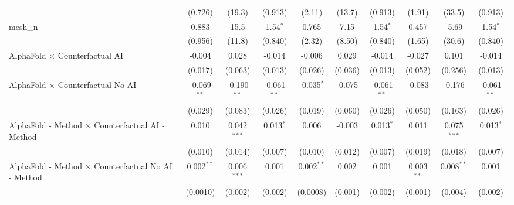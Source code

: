 \begin{tabular}{lccccccccc}
                                                               & (0.726)        & (19.3)         & (0.913)        & (2.11)         & (13.7)        & (0.913)        & (1.91)         & (33.5)         & (0.913)\\   
   mesh\_n                                                     & 0.883          & 15.5           & 1.54$^{*}$     & 0.765          & 7.15          & 1.54$^{*}$     & 0.457          & -5.69          & 1.54$^{*}$\\   
                                                               & (0.956)        & (11.8)         & (0.840)        & (2.32)         & (8.50)        & (0.840)        & (1.65)         & (30.6)         & (0.840)\\   
   AlphaFold $\times$ Counterfactual AI                        & -0.004         & 0.028          & -0.014         & -0.006         & 0.029         & -0.014         & -0.027         & 0.101          & -0.014\\   
                                                               & (0.017)        & (0.063)        & (0.013)        & (0.026)        & (0.036)       & (0.013)        & (0.052)        & (0.256)        & (0.013)\\   
   AlphaFold $\times$ Counterfactual No AI                     & -0.069$^{**}$  & -0.190$^{**}$  & -0.061$^{**}$  & -0.035$^{*}$   & -0.075        & -0.061$^{**}$  & -0.083         & -0.176         & -0.061$^{**}$\\   
                                                               & (0.029)        & (0.083)        & (0.026)        & (0.019)        & (0.060)       & (0.026)        & (0.050)        & (0.163)        & (0.026)\\   
   AlphaFold - Method $\times$ Counterfactual AI - Method      & 0.010          & 0.042$^{***}$  & 0.013$^{*}$    & 0.006          & -0.003        & 0.013$^{*}$    & 0.011          & 0.075$^{***}$  & 0.013$^{*}$\\   
                                                               & (0.010)        & (0.014)        & (0.007)        & (0.010)        & (0.012)       & (0.007)        & (0.019)        & (0.018)        & (0.007)\\   
   AlphaFold - Method $\times$ Counterfactual No AI - Method   & 0.002$^{**}$   & 0.006$^{***}$  & 0.001          & 0.002$^{**}$   & 0.002         & 0.001          & 0.003$^{**}$   & 0.008$^{**}$   & 0.001\\   
                                                               & (0.0010)       & (0.002)        & (0.002)        & (0.0008)       & (0.001)       & (0.002)        & (0.001)        & (0.004)        & (0.002)\\   

\end{tabular}
